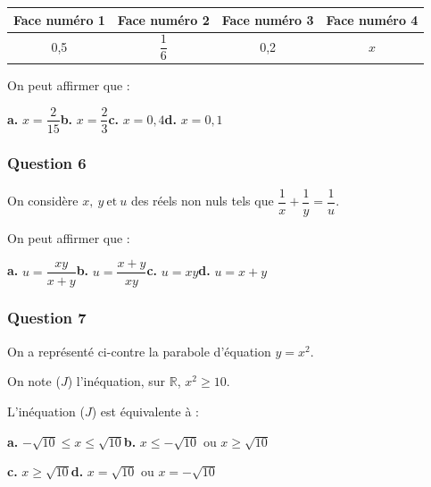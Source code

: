 \documentclass[10pt]{article}
\begin{document}
\begin{center}
\begin{tabular}{|c|c|c|c|}
\hline
Face numéro 1 & Face numéro 2 & Face numéro 3 & Face numéro 4 \\
\hline
0,5 & $\dfrac{1}{6}$ & 0,2 & $x$ \\
\hline
\end{tabular}
\end{center}

On peut affirmer que :

\textbf{a.} $x = \dfrac{2}{15}$\hfill \textbf{b.} $x = \dfrac{2}{3}$\hfill \textbf{c.} $x = 0,4$\hfill \textbf{d.} $x = 0,1$

\subsubsection*{Question 6}
On considère $x,~y~\text{et}~u$ des réels non nuls tels que $\dfrac{1}{x} + \dfrac{1}{y} = \dfrac{1}{u}.$

On peut affirmer que :

\textbf{a.} $u = \dfrac{xy}{x+y}$\hfill \textbf{b.} $u = \dfrac{x+y}{xy}$\hfill \textbf{c.} $u = xy$\hfill \textbf{d.} $u = x+y$

\subsubsection*{Question 7}

\begin{minipage}[t]{0.6\textwidth}
On a représenté ci-contre la parabole d'équation $y = x^2$.

On note ($J$) l'inéquation, sur $\mathbb{R}$, $x^2 \geq 10$.

\smallskip

L'inéquation ($J$) est équivalente à :

\smallskip

\textbf{a.} $-\sqrt{10} \leq x \leq \sqrt{10}$\hfill \textbf{b.} $x \leq -\sqrt{10}$ ou $x \geq \sqrt{10}$

\smallskip

\textbf{c.} $x \geq \sqrt{10}$\hfill \textbf{d.} $x = \sqrt{10}$ ou $x = -\sqrt{10}$
\end{minipage}
\hfill
\begin{minipage}[t]{0.35\textwidth}
\vspace{0pt}
\begin{center}
\end{center}
\end{minipage}
\end{document}
